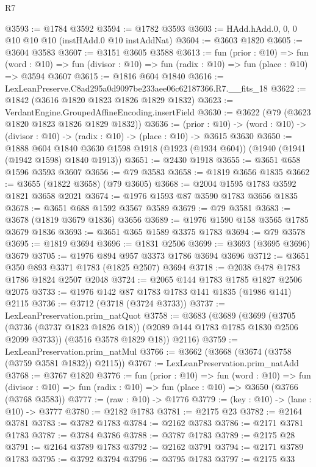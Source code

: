 \begin{lexlean}{R7}
\begin{coremodule}
@3593 := @1784 @3592
@3594 := @1782 @3593
@3603 := HAdd.hAdd.{0, 0, 0} @10 @10 @10 (instHAdd.{0} @10 instAddNat)
@3604 := @3603 @1820
@3605 := @3604 @3583
@3607 := @3151 @3605 @3588
@3613 := fun (prior : @10) =>
  fun (word : @10) => fun (divisor : @10) => fun (radix : @10) => fun (place : @10) => @3594 @3607
@3615 := @1816 @604 @1840
@3616 := LexLeanPreserve.C8ad295a0d9097be233aee06c62187366.R7.__fits_18
@3622 := @1842 (@3616 @1820 @1823 @1826 @1829 @1832)
@3623 := VerdantEngine.GroupedAffineEncoding.insertField
@3630 := @3622 (@79 (@3623 @1820 @1823 @1826 @1829 @1832))
@3636 := (prior : @10) ->
  (word : @10) -> (divisor : @10) -> (radix : @10) -> (place : @10) -> @3615 @3630
@3650 := @1888
    @604
    @1840
    @3630
    @1598
    @1918
    (@1923 (@1934 @604))
    (@1940 (@1941 (@1942 @1598) @1840 @1913))
@3651 := @2430 @1918
@3655 := @3651 @658 @1596 @3593 @3607
@3656 := @79 @3583
@3658 := @1819 @3656 @1835
@3662 := @3655 (@1822 @3658) (@79 @3605)
@3668 := @2004 @1595 @1783 @3592 @1821 @3658 @2021
@3674 := @1976 @1593 @87 @3590 @1783 @3656 @1835
@3678 := @3651 @688 @1592 @3567 @3589
@3679 := @79 @3581
@3683 := @3678 (@1819 @3679 @1836) @3656
@3689 := @1976 @1590 @158 @3565 @1785 @3679 @1836
@3693 := @3651 @365 @1589 @3375 @1783
@3694 := @79 @3578
@3695 := @1819 @3694
@3696 := @1831 @2506
@3699 := @3693 (@3695 @3696) @3679
@3705 := @1976 @894 @957 @3373 @1786 @3694 @3696
@3712 := @3651 @350 @893 @3371 @1783 (@1825 @2507) @3694
@3718 := @2038 @478 @1783 @1786 @1824 @2507 @2048
@3724 := @2065 @144 @1783 @1785 @1827 @2506 @2075
@3733 := @1976 @142 @87 @1783 @1783 @141 @1835 (@1986 @141) @2115
@3736 := @3712 (@3718 (@3724 @3733))
@3737 := LexLeanPreservation.prim_natQuot
@3758 := @3683
    (@3689
      (@3699
        (@3705 (@3736 (@3737 @1823 @1826 @18)) (@2089 @144 @1783 @1785 @1830 @2506 @2099 @3733))
        (@3516 @3578 @1829 @18))
      @2116)
@3759 := LexLeanPreservation.prim_natMul
@3766 := @3662 (@3668 (@3674 (@3758 (@3759 @3581 @1832)) @2115))
@3767 := LexLeanPreservation.prim_natAdd
@3768 := @3767 @1820
@3776 := fun (prior : @10) =>
  fun (word : @10) =>
  fun (divisor : @10) => fun (radix : @10) => fun (place : @10) => @3650 (@3766 (@3768 @3583))
@3777 := (raw : @10) -> @1776
@3779 := (key : @10) -> (lane : @10) -> @3777
@3780 := @2182 @1783
@3781 := @2175 @23
@3782 := @2164 @3781
@3783 := @3782 @1783
@3784 := @2162 @3783
@3786 := @2171 @3781 @1783
@3787 := @3784 @3786
@3788 := @3787 @1783
@3789 := @2175 @28
@3791 := @2164 @3789 @1783
@3792 := @2162 @3791
@3794 := @2171 @3789 @1783
@3795 := @3792 @3794
@3796 := @3795 @1783
@3797 := @2175 @33

\end{coremodule}
\end{lexlean}
